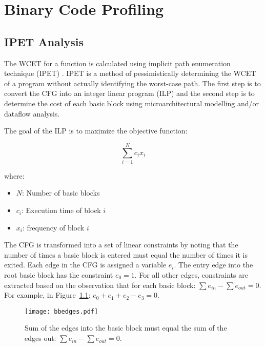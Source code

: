 
\chapter{Binary Code Profiling} %

\label{c:prof} %

\section{IPET Analysis}
The WCET for a function is calculated using implicit path enumeration technique (IPET) \cite{li1995performance}. IPET is a method of pessimistically determining the WCET of a
program without actually identifying the worst-case path. The first step is to convert the CFG into an integer linear program (ILP) and the second step is to determine the cost of each basic block using microarchitectural modelling and/or dataflow analysis. 

The goal of the ILP is to maximize the objective function:

\begin{equation}
\sum_{i=1}^{N}c_ix_i
\end{equation}

where:

\begin{itemize}
  \item $N$: Number of basic blocks
  \item $c_i$: Execution time of block $i$
  \item $x_i$: frequency of block $i$
\end{itemize}

The CFG is transformed into a set of linear constraints by noting that the number of times a basic block is entered must equal the number of times it is exited. Each edge in the CFG is assigned a variable $e_i$. The entry edge into the root basic block has the constraint $e_0 = 1$. For all other edges, constraints are extracted based on the observation that for each basic block: $\sum e_{in} - \sum e_{out} = 0$. For example, in Figure~\ref{f:bbedges}: $e_0+e_1+e_2-e_3=0$.

\begin{figure}[h]
\centering
\texttt{[image: bbedges.pdf]}
\caption{Sum of the edges into the basic block must equal the sum of the edges out: $\sum e_{in} - \sum e_{out} = 0$.} 
\label{f:bbedges}
\end{figure}


